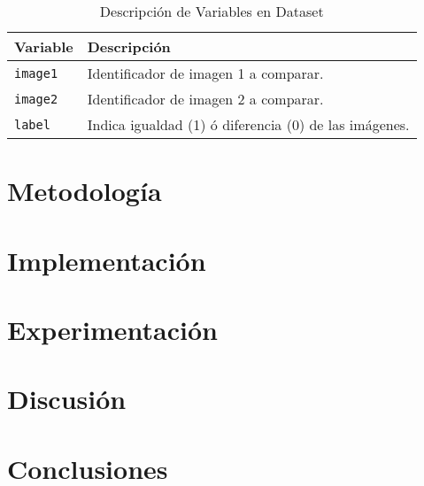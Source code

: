 \documentclass[conference]{IEEEtran}
\begin{document}
    \begin{table}[htbp]
        \caption{Descripción de Variables en Dataset}
        \begin{center}
            \begin{tabular}{|l|l|}\hline
            \textbf{Variable} & \textbf{Descripción} \\\hline
            \texttt{image1} & Identificador de imagen 1 a comparar.\\\hline
            \texttt{image2} & Identificador de imagen 2 a comparar.\\\hline
            \texttt{label} & Indica igualdad (1) ó diferencia (0) de las imágenes.\\\hline
            \end{tabular}
            \label{tab1}
        \end{center}
    \end{table}

    \section{Metodología}
    

    \section{Implementación}

    \section{Experimentación}

    \section{Discusión}

    \section{Conclusiones}
\end{document}
